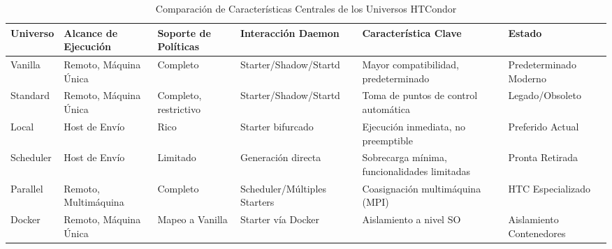 \begin{table}[h]
	\centering
	\small
	\caption{Comparación de Características Centrales de los Universos HTCondor}
	\begin{tabular}{@{}p{2cm}p{2.2cm}p{2.2cm}p{2.5cm}p{3cm}p{2cm}@{}}
		\toprule
		\textbf{Universo} & \textbf{Alcance de Ejecución} & \textbf{Soporte de Políticas} & \textbf{Interacción Daemon}  & \textbf{Característica Clave}                & \textbf{Estado}          \\
		\midrule
		Vanilla           & Remoto, Máquina Única         & Completo                      & Starter/Shadow/Startd        & Mayor compatibilidad, predeterminado         & Predeterminado Moderno   \\
		\addlinespace
		Standard          & Remoto, Máquina Única         & Completo, restrictivo         & Starter/Shadow/Startd        & Toma de puntos de control automática         & Legado/Obsoleto          \\
		\addlinespace
		Local             & Host de Envío                 & Rico                          & Starter bifurcado            & Ejecución inmediata, no preemptible          & Preferido Actual         \\
		\addlinespace
		Scheduler         & Host de Envío                 & Limitado                      & Generación directa           & Sobrecarga mínima, funcionalidades limitadas & Pronta Retirada          \\
		\addlinespace
		Parallel          & Remoto, Multimáquina          & Completo                      & Scheduler/Múltiples Starters & Coasignación multimáquina (MPI)              & HTC Especializado        \\
		\addlinespace
		Docker            & Remoto, Máquina Única         & Mapeo a Vanilla               & Starter vía Docker           & Aislamiento a nivel SO                       & Aislamiento Contenedores \\
	\end{tabular}
\end{table}
